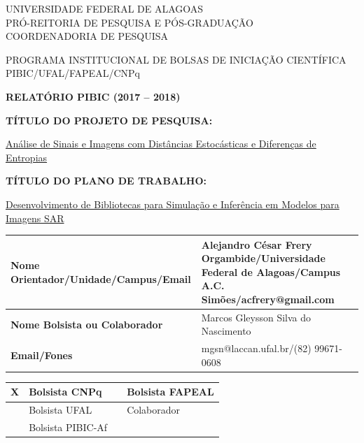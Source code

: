 \documentclass[12pt,letterpaper]{article}
\begin{document}
\onehalfspacing 
\thispagestyle{empty}
\begin{center}
\vspace{0.2cm}

\hrulefill

UNIVERSIDADE FEDERAL DE ALAGOAS\\
PRÓ-REITORIA DE PESQUISA E PÓS-GRADUAÇÃO\\
COORDENADORIA DE PESQUISA

\hrulefill

\vspace{0.5cm}

PROGRAMA INSTITUCIONAL DE BOLSAS DE INICIAÇÃO CIENTÍFICA\\PIBIC/UFAL/FAPEAL/CNPq

\vspace{1.0cm}

\textbf{\Large{RELATÓRIO PIBIC (2017 -- 2018)}}\\

\end{center}

\vspace{1.2cm}

\textbf{TÍTULO DO PROJETO DE PESQUISA:}

\underline{Análise de Sinais e Imagens com Distâncias Estocásticas e Diferenças de Entropias}

\textbf{TÍTULO DO PLANO DE TRABALHO:}

\underline{Desenvolvimento de Bibliotecas para Simulação e Inferência em Modelos para Imagens SAR}

\vspace{1cm}

\begin{table}[!h]
\begin{center}
\begin{tabularx}{\textwidth}{|X|X|X|}
\hline                              
\textbf{Nome Orientador/Unidade/Campus/Email} &  Alejandro César Frery Orgambide/Universidade Federal de Alagoas/Campus A.C. Simões/acfrery@gmail.com\\
\hline     
\textbf{Nome Bolsista ou Colaborador} & Marcos Gleysson Silva do Nascimento\\
\hline     
\textbf{Email/Fones} & mgsn@laccan.ufal.br/(82) 99671-0608\\
\hline     
\end{tabularx}
\end{center}
\end{table}

\begin{table}[!h]
\begin{center}
\begin{tabularx}{\textwidth}{|X|X|X|X|}
\hline                              
X & Bolsista CNPq &  &Bolsista FAPEAL\\
\hline             
& Bolsista UFAL &  &Colaborador\\
\hline             
& Bolsista PIBIC-Af&  &\\
\hline     
\end{tabularx}
\end{center}
\end{table}
\end{document}
